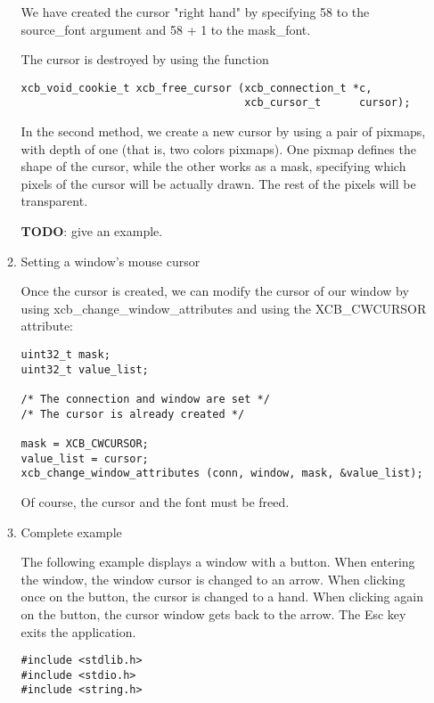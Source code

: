 \documentclass[12pt,oneside,titlepage]{book}
\begin{document}
\begin{enumerate}
\begin{enumerate}
    We have created the cursor "right hand" by specifying 58 to the
    {source\_fon}t argument and 58 + 1 to the {mask\_font}.

    The cursor is destroyed by using the function

\begin{verbatim}
xcb_void_cookie_t xcb_free_cursor (xcb_connection_t *c,
                                   xcb_cursor_t      cursor);
\end{verbatim}

    In the second method, we create a new cursor by using a pair of
    pixmaps, with depth of one (that is, two colors pixmaps). One pixmap
    defines the shape of the cursor, while the other works as a mask,
    specifying which pixels of the cursor will be actually drawn. The
    rest of the pixels will be transparent.

    \textbf{TODO}: give an example.
  \item
    \protect\hypertarget{mousecursorset}{}{Setting a window's mouse
    cursor}

    Once the cursor is created, we can modify the cursor of our window
    by using {xcb\_change\_window\_attributes} and using the
    {XCB\_CWCURSOR} attribute:

\begin{verbatim}
uint32_t mask;
uint32_t value_list;

/* The connection and window are set */
/* The cursor is already created */

mask = XCB_CWCURSOR;
value_list = cursor;
xcb_change_window_attributes (conn, window, mask, &value_list);
\end{verbatim}

    Of course, the cursor and the font must be freed.
  \item
    \protect\hypertarget{mousecursorexample}{}{Complete example}

    The following example displays a window with a button. When entering
    the window, the window cursor is changed to an arrow. When clicking
    once on the button, the cursor is changed to a hand. When clicking
    again on the button, the cursor window gets back to the arrow. The
    Esc key exits the application.

\begin{verbatim}
#include <stdlib.h>
#include <stdio.h>
#include <string.h>


\end{verbatim}
\end{enumerate}
\end{enumerate}
\end{document}
